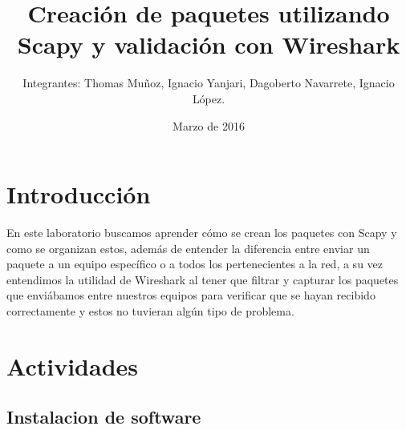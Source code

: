 \documentclass{udpreport}
\title{Creación de paquetes utilizando Scapy y validación con Wireshark}
\author{Integrantes: Thomas Muñoz, Ignacio Yanjari, Dagoberto Navarrete, Ignacio López.}
\date{Marzo de 2016}
\begin{document}
\maketitle
\tableofcontents
\chapter{Introducción}
	En este laboratorio buscamos aprender cómo se crean los paquetes con Scapy y como se organizan estos, además de entender la
	diferencia entre enviar un paquete a un equipo específico o a todos los pertenecientes a la red, a su vez entendimos la
	utilidad de Wireshark al tener que filtrar y capturar los paquetes que enviábamos entre nuestros equipos para verificar que se
	hayan recibido correctamente y estos no tuvieran algún tipo de problema.
\chapter{Actividades}
	\section{Instalacion de software}
\end{document}
